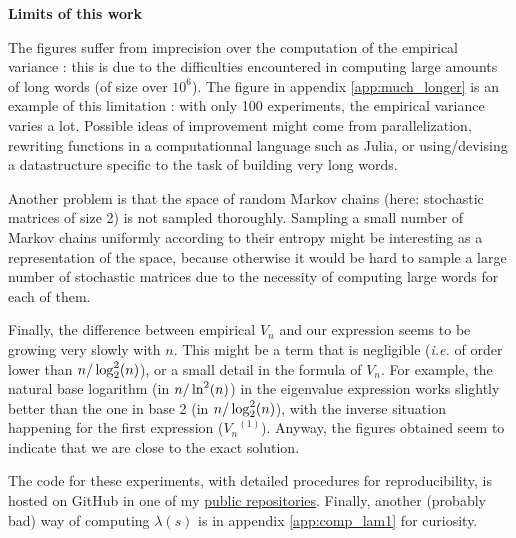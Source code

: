 \begin{remarque}
\noindent \textbf{Limits of this work}


The figures suffer from imprecision over the computation of the empirical 
variance : this is due to the difficulties encountered in computing large amounts
of long words (of size over $10^6$). The figure in appendix \ref{app:much_longer} is 
an example of this limitation : with only 100 experiments, the empirical variance 
varies a lot. Possible ideas of improvement might come from parallelization,
rewriting functions in a computationnal language such as Julia, or using/devising a datastructure
specific to the task of building very long words.

Another problem is that the space of random Markov chains (here: stochastic matrices
of size 2) is not sampled thoroughly. Sampling a small number of Markov chains uniformly
according to their entropy might be interesting as a representation of the space,
 because otherwise it would be hard to sample a large number of stochastic matrices
due to the necessity of computing large words for each of them.

Finally, the difference between empirical $V_n$ and our expression seems to be growing
very slowly with $n$. This might be a term that is negligible (\textit{i.e.} of 
order lower than $n/\log_2^2(n)$), or a small detail in the formula of $V_n$. 
For example, the natural base logarithm (in $n/\ln^2(n)$) in the eigenvalue expression works slightly
better than the one in base 2 (in $n/\log_2^2(n)$), with the inverse situation happening for the first 
expression (${V_n}^{(1)}$). Anyway, the figures obtained seem to 
indicate that we are close to the exact solution.

\end{remarque}


The code for these experiments, with detailed procedures for reproducibility,
is hosted on GitHub in one of my \href{github.com/gliboc/lz-compression}{public repositories}.
Finally, another (probably bad) way of computing $\lambda(s)$ is in appendix \ref{app:comp_lam1}
for curiosity.



 


